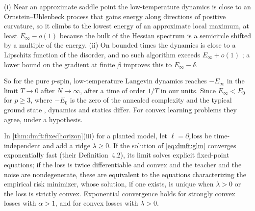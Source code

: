 \begin{refsection}
\begin{proofsketch}
(i) Near an approximate saddle point the low-temperature dynamics is close to an Ornstein--Uhlenbeck process that gains energy along directions of positive curvature, so it climbs to the lowest energy of an approximate local maximum, at least $E_\infty-o(1)$ because the bulk of the Hessian spectrum is a semicircle shifted by a multiple of the energy. (ii) On bounded times the dynamics is close to a Lipschitz function of the disorder, and no such algorithm exceeds $E_\infty+o(1)$ \parencite{HuangSellke2025}; a lower bound on the gradient at finite $\beta$ improves this to $E_\infty-\delta$.
\end{proofsketch}

So for the pure $p$-spin, low-temperature Langevin dynamics reaches $-E_\infty$ in the limit $T\to0$ after $N\to\infty$, after a time of order $1/T$ in our units. Since $E_\infty<E_0$ for $p\ge3$, where $-E_0$ is the zero of the annealed complexity \parencite{AuffingerBenArousCerny2013} and the typical ground state \parencite{Subag2017a}, dynamics and statics differ. For convex learning problems they agree, under a hypothesis.

\begin{proposition}\label{prop:dmft:convex}
In \cref{thm:dmft:fixedhorizon}(iii) for a planted model, let $\ell=\partial_r\mathrm{loss}$ be time-independent and add a ridge $\lambda\ge0$. If the solution of \eqref{eq:dmft:glm} converges exponentially fast (their Definition~4.2), its limit solves explicit fixed-point equations; if the loss is twice differentiable and convex and the teacher and the noise are nondegenerate, these are equivalent to the equations characterizing the empirical risk minimizer, whose solution, if one exists, is unique when $\lambda>0$ or the loss is strictly convex. Exponential convergence holds for strongly convex losses with $\alpha>1$, and for convex losses with $\lambda>0$.
\end{proposition}


\end{refsection}

